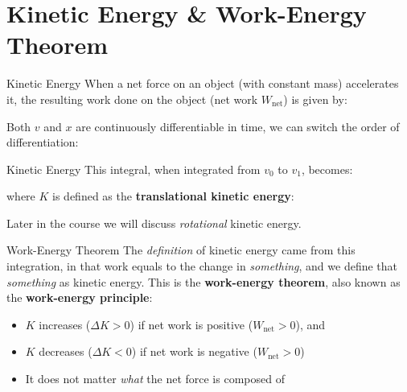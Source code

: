 \documentclass[12pt,compress,aspectratio=169]{beamer}
\begin{document}
\section{Kinetic Energy \& Work-Energy Theorem}

\begin{frame}{Kinetic Energy}
  When a net force on an object (with constant mass) accelerates it, the
  resulting work done on the object (net work $W_\text{net}$) is given by:


  Both $v$ and $x$ are continuously differentiable in time, we can switch the
  order of differentiation:
  
\end{frame}



\begin{frame}{Kinetic Energy}
  This integral, when integrated from $v_0$ to $v_1$, becomes:

  
  where $K$ is defined as the \textbf{translational kinetic energy}:


  Later in the course we will discuss \emph{rotational} kinetic energy.
\end{frame}



\begin{frame}{Work-Energy Theorem}
  The \emph{definition} of kinetic energy came from this integration, in that
  work equals to the change in \emph{something}, and we define that
  \emph{something} as kinetic energy. This is the \textbf{work-energy theorem},
  also known as the \textbf{work-energy principle}:

  \begin{itemize}
  \item $K$ increases ($\Delta K>0$) if net work is positive ($W_\text{net}>0$),
    and
  \item $K$ decreases ($\Delta K<0$) if net work is negative ($W_\text{net}>0$)
  \item It does not matter \emph{what} the net force is composed of
  \end{itemize}
\end{frame}
\end{document}
